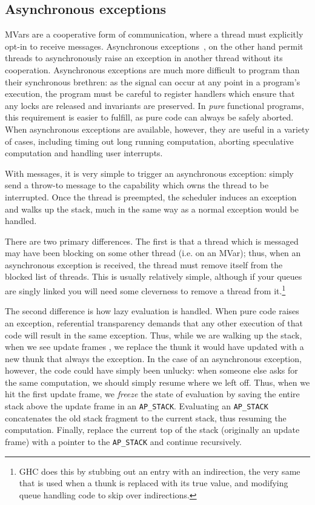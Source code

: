 \subsection{Asynchronous exceptions}

MVars are a cooperative form of communication, where a thread must
explicitly opt-in to receive messages.  Asynchronous
exceptions~\cite{Marlow:2001:AEH:378795.378858}, on the other hand
permit threads to asynchronously raise an exception in another thread
without its cooperation.  Asynchronous exceptions are much more
difficult to program than their synchronous brethren: as the signal can
occur at any point in a program's execution, the program must be careful
to register handlers which ensure that any locks are released and
invariants are preserved.  In \emph{pure} functional programs, this requirement
is easier to fulfill, as pure code can always be safely aborted.  When
asynchronous exceptions are available, however, they are useful
in a variety of cases, including timing out long running computation,
aborting speculative computation and handling user interrupts.

With messages, it is very simple to trigger an asynchronous exception:
simply send a throw-to message to the capability which owns the thread
to be interrupted.  Once the thread is preempted, the scheduler induces
an exception and walks up the stack, much in the same way as a normal
exception would be handled.

There are two primary differences.  The first is that a thread which
is messaged may have been blocking on some other thread (i.e. on an MVar);
thus, when an asynchronous exception is received, the thread must remove itself
from the blocked list of threads.  This is usually relatively simple, although
if your queues are singly linked you will need some cleverness to remove
a thread from it.\footnote{GHC does this by stubbing out an entry with an
indirection, the very same that is used when a thunk is replaced with its
true value, and modifying queue handling code to skip over indirections.}

The second difference is how lazy evaluation is handled. When pure code
raises an exception, referential transparency demands that any other
execution of that code will result in the same exception.  Thus, while
we are walking up the stack, when we see update frames ,
we replace the thunk it would have updated with a new thunk that always
the exception.  In the case of an asynchronous exception, however, the
code could have simply been unlucky: when someone else asks for the same
computation, we should simply resume where we left off.  Thus, when we
hit the first update frame, we \emph{freeze} the state of evaluation by
saving the entire stack above the
update frame in an \verb|AP_STACK|.  Evaluating an
\verb|AP_STACK| concatenates the old stack fragment to the current
stack, thus resuming the computation.  Finally, replace the current top
of the stack (originally an update frame) with a pointer to the
\verb|AP_STACK| and continue recursively. 

